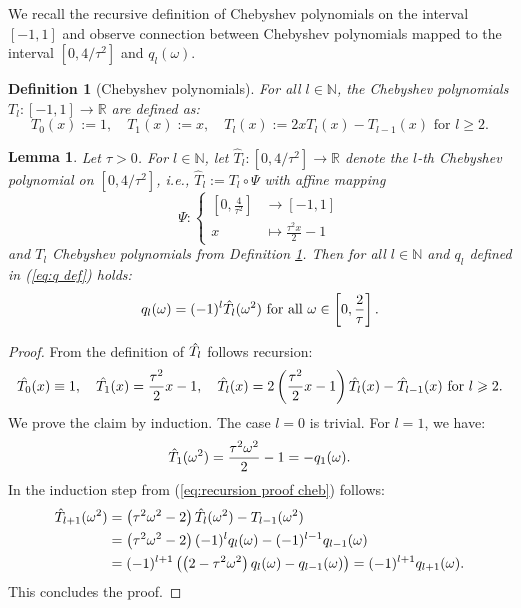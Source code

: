 \documentclass[a4paper,11pt,bibliography=totoc,listof=totoc,headinclude=true,cleardoublepage=empty,oneside]{scrbook}
\newtheorem{definition}[theorem]{Definition}
\newtheorem{lemma}[theorem]{Lemma}
\newcommand{\R}{\mathbb{R}}
\newcommand{\N}{\mathbb{N}}
\renewcommand{\eqref}[1]{(\ref{#1})}
\begin{document}
We recall the recursive definition of Chebyshev polynomials on the interval $[-1, 1]$ \cite[p. 23]{numericsAB} and observe connection between Chebyshev polynomials mapped to the interval $[0, 4/\tau^2]$ and $q_l(\omega)$.

\begin{definition}[Chebyshev polynomials]\label{def:chebyshev polynomials}
    For all $l\in \N$, the Chebyshev polynomials $T_l: [-1, 1] \rightarrow \R$ are defined as:
    \begin{equation*}
        T_0(x) := 1, \quad T_1(x) := x, \quad T_l(x) := 2xT_l(x) - T_{l-1}(x) \text{ for } l \geqslant 2.
    \end{equation*}
\end{definition}

\begin{lemma}\label{lemma:q chebyshev}
    Let $\tau > 0$. For $l\in \N$, let $\hat{T}_l : [0, 4/\tau^2] \rightarrow \R $ denote the $l$-th Chebyshev polynomial on $[0, 4/\tau^2]$, i.e., $\hat{T}_l := T_l \circ \Psi$ with affine mapping 
    \begin{equation*}
        \Psi: \begin{cases}\left[0, \frac{4}{\tau^2}\right] &\rightarrow [-1, 1]\\ x &\mapsto \frac{\tau^2 x}{2} - 1\end{cases}
    \end{equation*}
    and $T_l$ Chebyshev polynomials from Definition \ref{def:chebyshev polynomials}. Then for all $l\in \N$ and $q_l$ defined in \eqref{eq:q def} holds: 
    \begin{equation*}
        q_l(\omega) = (-1)^l \Hat{T_l}(\omega^2) \text{ for all } \omega \in \left[0, \frac{2}{\tau}\right].
    \end{equation*}
\end{lemma}
\begin{proof}
    From the definition of $\Hat{T_l}$ follows recursion:
    \begin{equation}\label{eq:recursion proof cheb}
        \Hat{T_0}(x) \equiv 1, \quad \Hat{T_1}(x) = \frac{\tau^2}{2}x - 1, \quad \Hat{T_l}(x) = 2\left(\frac{\tau^2}{2}x - 1\right)\Hat{T_l}(x) - \Hat{T}_{l-1}(x) \text{ for } l \geqslant 2.
    \end{equation}
    We prove the claim by induction. The case $l=0$ is trivial. For $l=1$, we have:
    \begin{equation*}
        \Hat{T}_1(\omega^2) = \frac{\tau^2\omega^2}{2} - 1 = -q_1(\omega).
    \end{equation*}
    In the induction step from \eqref{eq:recursion proof cheb} follows:
    \begin{align*}
        \Hat{T}_{l+1}(\omega^2) &= \left(\tau^2 \omega^2 -2\right) \Hat{T}_l(\omega^2) - T_{l-1}(\omega^2) \\ &= \left(\tau^2 \omega^2 -2\right) (-1)^l q_l(\omega) - (-1)^{l-1} q_{l-1}(\omega) \\ &= (-1)^{l+1} \left( \left(2-\tau^2\omega^2\right)q_l(\omega) - q_{l-1}(\omega)\right) = (-1)^{l+1} q_{l+1}(\omega).
    \end{align*}
    This concludes the proof.
\end{proof}
\end{document}
